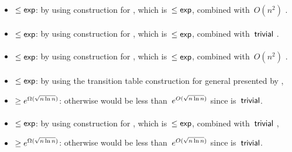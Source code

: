 \paragraph{\OMOLA{}\tto\TDFA}
\begin{itemize}
	\item $\le\mathsf{exp}$: by using construction for \hyperref[cost:OM1LAto1NFAu]{\OMOLA{}\tto\ONFA}, which is~$\le\mathsf{exp}$, combined with~$O(n^2)$ \ONFA{}\tto\TDFA.
\end{itemize}
\paragraph{\OMOLA{}\tto\TNFA}
\begin{itemize}
	\item $\le\mathsf{exp}$: by using construction for \hyperref[cost:OM1LAto1NFAu]{\OMOLA{}\tto\ONFA}, which is~$\le\mathsf{exp}$, combined with~$\mathsf{trivial}$ \ONFA{}\tto\TNFA.
\end{itemize}
\paragraph{\OMOLA{}\tto\OMODLA}
\begin{itemize}
	\item $\le\mathsf{exp}$: by using construction for \hyperref[cost:OM1LAto1NFAu]{\OMOLA{}\tto\ONFA}, which is~$\le\mathsf{exp}$, combined with~$O(n^2)$ \hyperref[cost:1NFAtoOM1DLAu]{\ONFA{}\tto\OMODLA}.
\end{itemize}
\paragraph{\OMODLA{}\tto\ODFA}\label{cost:OM1DLAto1DFAu}
\begin{itemize}
	\item $\le\mathsf{exp}$: by using the transition table construction for general \ODLAs presented by ,
	\item $\ge e^{\Omega(\sqrt{n\ln n})}$: otherwise \hyperref[cost:2DFAto1DFAu]{\TDFA{}\tto\ODFA} would be less than~$e^{O(\sqrt{n\ln n})}$ since \TDFA{}\tto\OMODLA is~$\mathsf{trivial}$.
\end{itemize}
\paragraph{\OMODLA{}\tto\ONFA}
\begin{itemize}
	\item $\le\mathsf{exp}$: by using construction for \hyperref[cost:OM1DLAto1DFAu]{\OMODLA{}\tto\ODFA}, which is~$\le\mathsf{exp}$, combined with~$\mathsf{trivial}$ \ODFA{}\tto\ONFA,
	\item $\ge e^{\Omega(\sqrt{n\ln n})}$: otherwise \hyperref[cost:2DFAto1NFAu]{\TDFA{}\tto\ONFA} would be less than~$e^{O(\sqrt{n\ln n})}$ since \TDFA{}\tto\OMODLA is~$\mathsf{trivial}$.
\end{itemize}
